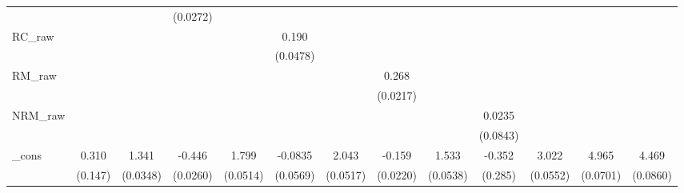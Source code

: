 \begin{table}[htbp]
\begin{tabular}{l*{12}{c}}
            &                     &                     &    (0.0272)         &                     &                     &                     &                     &                     &                     &                     &                     &                     \\
[1em]
RC\_raw      &                     &                     &                     &                     &       0.190\sym{***}&                     &                     &                     &                     &                     &                     &                     \\
            &                     &                     &                     &                     &    (0.0478)         &                     &                     &                     &                     &                     &                     &                     \\
[1em]
RM\_raw      &                     &                     &                     &                     &                     &                     &       0.268\sym{***}&                     &                     &                     &                     &                     \\
            &                     &                     &                     &                     &                     &                     &    (0.0217)         &                     &                     &                     &                     &                     \\
[1em]
NRM\_raw     &                     &                     &                     &                     &                     &                     &                     &                     &      0.0235         &                     &                     &                     \\
            &                     &                     &                     &                     &                     &                     &                     &                     &    (0.0843)         &                     &                     &                     \\
[1em]
\_cons      &       0.310\sym{**} &       1.341\sym{***}&      -0.446\sym{***}&       1.799\sym{***}&     -0.0835         &       2.043\sym{***}&      -0.159\sym{***}&       1.533\sym{***}&      -0.352         &       3.022\sym{***}&       4.965\sym{***}&       4.469\sym{***}\\
            &     (0.147)         &    (0.0348)         &    (0.0260)         &    (0.0514)         &    (0.0569)         &    (0.0517)         &    (0.0220)         &    (0.0538)         &     (0.285)         &    (0.0552)         &    (0.0701)         &    (0.0860)         \\

\end{tabular}
\end{table}
